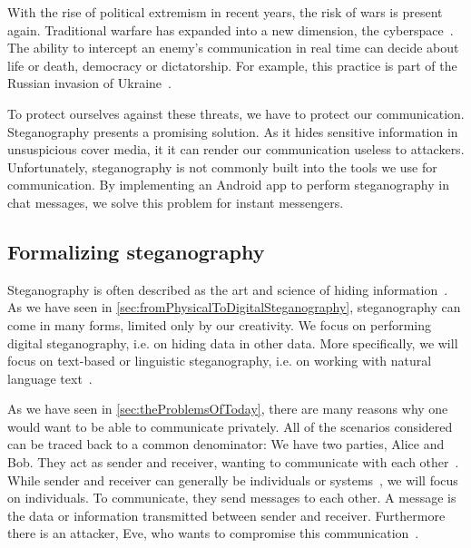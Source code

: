 With the rise of political extremism in recent years, the risk of wars is present again. Traditional warfare has expanded into a new dimension, the cyberspace~\cite{serpanosCyberwarfareUkraine2022}. The ability to intercept an enemy's communication in real time can decide about life or death, democracy or dictatorship. For example, this practice is part of the Russian invasion of Ukraine~\cite{sufiSocialMediaAnalytics2023}.

To protect ourselves against these threats, we have to protect our communication. Steganography presents a promising solution. As it hides sensitive information in unsuspicious cover media, it it can render our communication useless to attackers. Unfortunately, steganography is not commonly built into the tools we use for communication. By implementing an Android app to perform steganography in chat messages, we solve this problem for instant messengers.

\subsection{Formalizing steganography}
\label{sec:formalizingSteganography}
Steganography is often described as the art and science of hiding information~\cite{bennettLinguisticSteganographySurvey2004,wuGenerativeTextSteganography2024}. As we have seen in \cref{sec:fromPhysicalToDigitalSteganography}, steganography can come in many forms, limited only by our creativity. We focus on performing digital steganography, i.e. on hiding data in other data. More specifically, we will focus on text-based or linguistic steganography, i.e. on working with natural language text~\cite{zieglerNeuralLinguisticSteganography2019}.

As we have seen in \cref{sec:theProblemsOfToday}, there are many reasons why one would want to be able to communicate privately. All of the scenarios considered can be traced back to a common denominator: We have two parties, Alice and Bob. They act as sender and receiver, wanting to communicate with each other~\cite{wuGenerativeTextSteganography2024}. While sender and receiver can generally be individuals or systems~\cite{bennettLinguisticSteganographySurvey2004}, we will focus on individuals. To communicate, they send messages to each other. A message is the data or information transmitted between sender and receiver. Furthermore there is an attacker, Eve, who wants to compromise this communication~\cite{al-aniOverviewMainFundamentals2010,wuGenerativeTextSteganography2024}.

